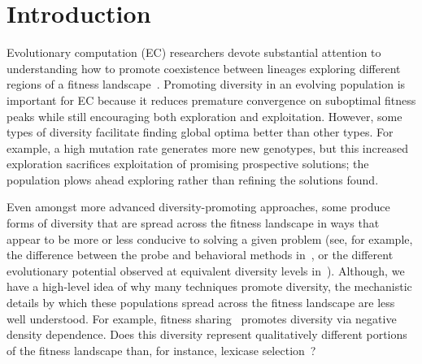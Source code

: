 \section{Introduction}

Evolutionary computation (EC) researchers devote substantial attention to understanding how to promote coexistence between lineages %
exploring different regions of a fitness landscape~\cite{goldberg_genetic_1987,mahfoud_niching_1995, mouret_using_2009,pugh_confronting_2015}. 
Promoting diversity in an evolving population is important for EC because it reduces premature convergence on suboptimal fitness peaks while still encouraging both exploration and exploitation. However, some types of diversity facilitate finding global optima better than other types. For example, a high mutation rate generates more new genotypes, but this increased exploration sacrifices exploitation of promising prospective solutions; the population plows ahead exploring rather than refining the solutions found.

Even amongst more advanced diversity-promoting approaches, some produce forms of diversity that are spread across the fitness landscape in ways that appear to be more or less conducive to solving a given problem (see, for example, the difference between the probe and behavioral methods in~\cite{mouret_using_2009}, or the different evolutionary potential observed at equivalent diversity levels in~\cite{walker_evolutionary_2012}). Although, we have a high-level idea of why many techniques promote diversity, the mechanistic details by which these populations spread across the fitness landscape are less well understood.
For example, fitness sharing~\cite{goldberg_genetic_1987} promotes diversity via negative density dependence. Does this diversity represent qualitatively different portions of the fitness landscape than, for instance, lexicase selection~\cite{spector_assessment_2012}?

